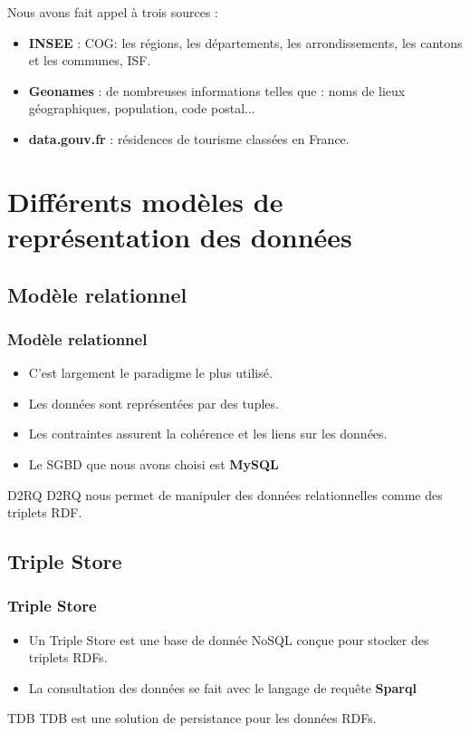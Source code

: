 \documentclass[12pt]{beamer}
\begin{document}
\begin{frame}
Nous avons fait appel à trois sources  :
\begin{itemize}
	\item \textbf{INSEE} : COG:  les régions, les départements, les arrondissements, les cantons et les communes, ISF.
	\item \textbf{Geonames} :  de nombreuses informations telles que : noms de lieux géographiques, population, code postal...
	\item \textbf{data.gouv.fr} :  résidences de tourisme classées en France.
\end{itemize}




\end{frame}

\section{Différents modèles de représentation des données}


\subsection{Modèle relationnel}

\begin{frame}
\frametitle{Modèle relationnel}
\begin{itemize}
\item C'est largement le paradigme le plus utilisé.
\item Les données sont représentées par des tuples.
\item Les contraintes assurent la cohérence et les liens sur les données.
\item Le SGBD que nous avons choisi est \textbf{MySQL}
\end{itemize}
\begin{block}{D2RQ}
D2RQ nous permet de manipuler des données relationnelles comme des triplets RDF.
\end{block}




\end{frame}
\subsection{Triple Store}
\begin{frame}
\frametitle{Triple Store}

\begin{itemize}
\item Un Triple Store est une base de donnée NoSQL conçue pour stocker des triplets RDFs.
\item La consultation des données se fait avec le langage de requête \textbf{Sparql}
\end{itemize}

\begin{block}{TDB}
TDB est une solution de persistance pour les données RDFs.
\end{block}
\end{frame}
\end{document}
